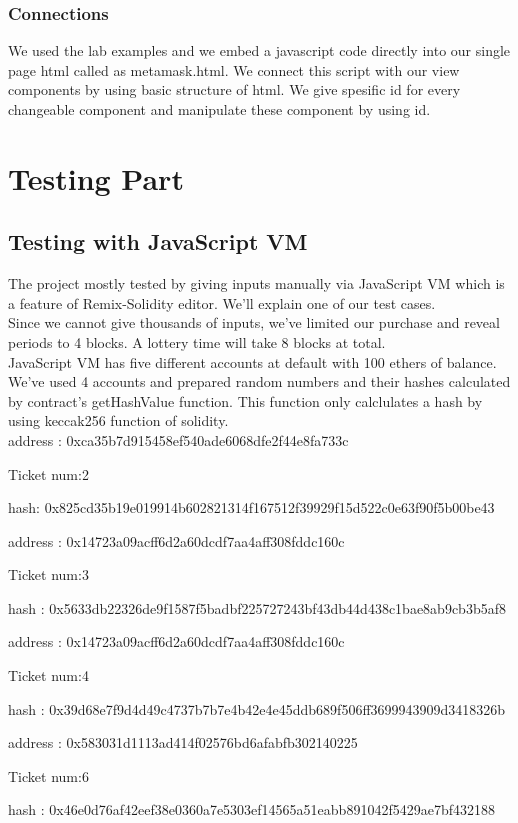 \documentclass[]{scrreprt}
\begin{document}
		\subsection{Connections}
		We used the lab examples and we embed a javascript code directly into our single page html called as metamask.html. We connect this script with our view components by using basic structure of html. We give spesific id for every changeable component and manipulate these component by using id.
	\chapter{Testing Part}
		\section{Testing with JavaScript VM}
		The project mostly tested by giving inputs manually via JavaScript VM which is a feature of Remix-Solidity editor. We'll explain one of our test cases.\\
		Since we cannot give thousands of inputs, we've limited our purchase and reveal periods to 4 blocks. A lottery time will take 8 blocks at total. \\
		JavaScript VM has five different accounts at default with 100 ethers of balance. We've used 4 accounts and prepared random numbers and their hashes calculated by contract's getHashValue function. This function only calclulates a hash by using keccak256 function of solidity.\\

		address : 0xca35b7d915458ef540ade6068dfe2f44e8fa733c
		
		Ticket num:2 
		
		hash: 0x825cd35b19e019914b602821314f167512f39929f15d522c0e63f90f5b00be43

		address : 0x14723a09acff6d2a60dcdf7aa4aff308fddc160c
		
		Ticket num:3 
		
		hash : 0x5633db22326de9f1587f5badbf225727243bf43db44d438c1bae8ab9cb3b5af8

		address : 0x14723a09acff6d2a60dcdf7aa4aff308fddc160c
		
		Ticket num:4 
		
		hash : 0x39d68e7f9d4d49c4737b7b7e4b42e4e45ddb689f506ff3699943909d3418326b

		address : 0x583031d1113ad414f02576bd6afabfb302140225
		
		Ticket num:6 
		
		hash : 0x46e0d76af42eef38e0360a7e5303ef14565a51eabb891042f5429ae7bf432188
\end{document}
